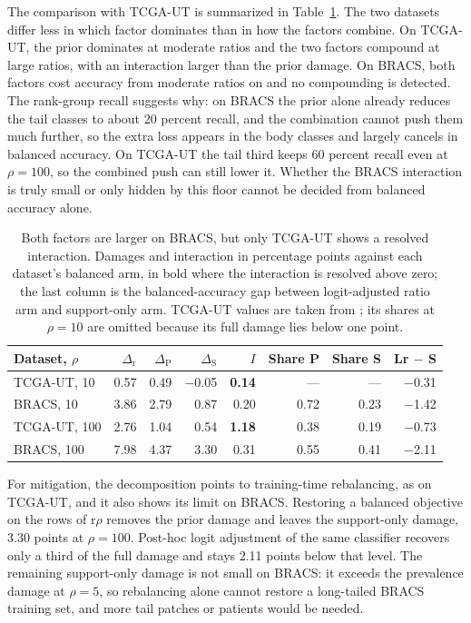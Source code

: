 The comparison with TCGA-UT is summarized in Table~\ref{tab:cross}. The two datasets differ less in which factor dominates than in how the factors combine. On TCGA-UT, the prior dominates at moderate ratios and the two factors compound at large ratios, with an interaction larger than the prior damage. On BRACS, both factors cost accuracy from moderate ratios on and no compounding is detected. The rank-group recall suggests why: on BRACS the prior alone already reduces the tail classes to about 20 percent recall, and the combination cannot push them much further, so the extra loss appears in the body classes and largely cancels in balanced accuracy. On TCGA-UT the tail third keeps 60 percent recall even at $\rho=100$, so the combined push can still lower it. Whether the BRACS interaction is truly small or only hidden by this floor cannot be decided from balanced accuracy alone.

\begin{table}[htbp]
\centering
\renewcommand{\arraystretch}{1.15}
\begin{tabular}{@{}lrrrrrrr@{}}
\toprule
Dataset, $\rho$ & $\Delta_\text{r}$ & $\Delta_\text{P}$ & $\Delta_\text{S}$ & $I$ & Share P & Share S & Lr $-$ S \\
\midrule
TCGA-UT, 10 & 0.57 & 0.49 & $-$0.05 & \textbf{0.14} & --- & --- & $-$0.31 \\
BRACS, 10 & 3.86 & 2.79 & 0.87 & 0.20 & 0.72 & 0.23 & $-$1.42 \\
\addlinespace
TCGA-UT, 100 & 2.76 & 1.04 & 0.54 & \textbf{1.18} & 0.38 & 0.19 & $-$0.73 \\
BRACS, 100 & 7.98 & 4.37 & 3.30 & 0.31 & 0.55 & 0.41 & $-$2.11 \\
\bottomrule
\end{tabular}
\caption{Both factors are larger on BRACS, but only TCGA-UT shows a resolved interaction. Damages and interaction in percentage points against each dataset's balanced arm, in bold where the interaction is resolved above zero; the last column is the balanced-accuracy gap between logit-adjusted ratio arm and support-only arm. TCGA-UT values are taken from \citet{queisler2026causeTcga}; its shares at $\rho=10$ are omitted because its full damage lies below one point.}
\label{tab:cross}
\end{table}

\noindent For mitigation, the decomposition points to training-time rebalancing, as on TCGA-UT, and it also shows its limit on BRACS. Restoring a balanced objective on the rows of r$\rho$ removes the prior damage and leaves the support-only damage, 3.30 points at $\rho=100$. Post-hoc logit adjustment of the same classifier recovers only a third of the full damage and stays 2.11 points below that level. The remaining support-only damage is not small on BRACS: it exceeds the prevalence damage at $\rho=5$, so rebalancing alone cannot restore a long-tailed BRACS training set, and more tail patches or patients would be needed.

